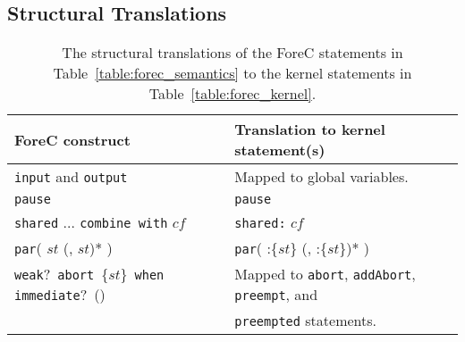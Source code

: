 
\subsection{Structural Translations}
\label{sec:formalSemantics_translations}

\begin{table}
	\centering
	\renewcommand{\arraystretch}{1.25}
	
	\begin{tabular}{| l | l |}
		\hline
		\bf{ForeC construct}														& \bf{Translation to kernel statement(s)}						\\ \hline
		\verb$input$ and \verb$output$												& Mapped to global variables.									\\ \hline
		\verb$pause$																& \verb$pause$													\\ \hline
		\verb$shared$ $\dots$ \verb$combine with$ $cf$								& \verb$shared:$ $cf$											\\ \hline
		\verb$par$( $st$ (, $st$)* )												& \verb$par$( \thread{}:\{$st$\} (, \thread{}:\{$st$\})* )		\\ \hline
		\verb$weak$?~\verb$abort$~\{$st$\}~\verb$when immediate$?~(\expression{})	& Mapped to \verb$abort$, \verb$addAbort$, \verb$preempt$, and 	\\
																					& \verb$preempted$ statements.									\\ \hline
	\end{tabular}
	
	\caption{The structural translations of the ForeC statements in 
			 Table~\ref{table:forec_semantics} to the kernel statements 
			 in Table~\ref{table:forec_kernel}.}
	\label{table:forec_structural_translations}
\end{table}


